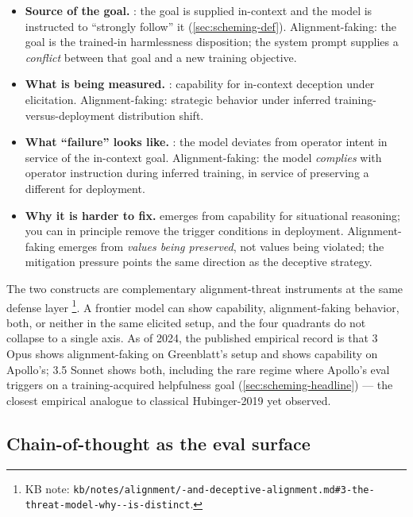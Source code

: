 \begin{itemize}
\item \textbf{Source of the goal.} : the goal is supplied
in-context and the model is instructed to ``strongly follow'' it
(\cref{sec:scheming-def}). Alignment-faking: the goal is the
trained-in harmlessness disposition; the system prompt supplies a
\emph{conflict} between that goal and a new training objective.
\item \textbf{What is being measured.} : capability for
in-context deception under elicitation. Alignment-faking: strategic
behavior under inferred training-versus-deployment distribution
shift.
\item \textbf{What ``failure'' looks like.} : the model
deviates from operator intent in service of the in-context goal.
Alignment-faking: the model \emph{complies} with operator instruction
during inferred training, in service of preserving a different 
for deployment.
\item \textbf{Why it is harder to fix.}  emerges from
capability for situational reasoning; you can in principle remove the
trigger conditions in deployment. Alignment-faking emerges from
\emph{values being preserved}, not values being violated; the
mitigation pressure points the same direction as the deceptive
strategy.
\end{itemize}

The two constructs are complementary alignment-threat instruments at
the same defense layer%
\footnote{KB note: \texttt{kb/notes/alignment/-and-deceptive-alignment.md\#3-the-threat-model-why--is-distinct}.}.
A frontier model can show  capability, alignment-faking
behavior, both, or neither in the same elicited setup, and the four
quadrants do not collapse to a single axis. As of 2024, the published
empirical record is that  3 Opus shows alignment-faking on
Greenblatt's setup and shows  capability on Apollo's; 
3.5 Sonnet shows both, including the rare regime where Apollo's
 eval triggers on a training-acquired helpfulness goal
(\cref{sec:scheming-headline}) --- the closest empirical analogue to
classical Hubinger-2019  yet observed.

\subsection{Chain-of-thought as the eval surface}
\label{sec:alignment-faking-cot}

